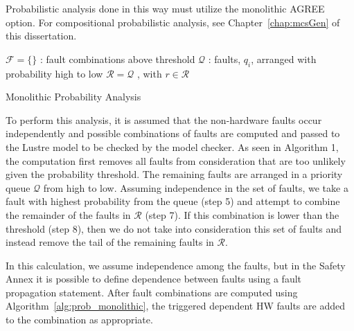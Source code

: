 Probabilistic analysis done in this way must utilize the monolithic AGREE option. For compositional probabilistic analysis, see Chapter~\ref{chap:mcsGen} of this dissertation.

\begin{algorithm}[H]
	$\mathcal{F} = \{\}$ : fault combinations above threshold \;
	$\mathcal{Q}$ : faults, $q_i$, arranged with probability high to low \;
	$\mathcal{R} = \mathcal{Q}$ , with $r \in \mathcal{R}$\;
	\caption{Monolithic Probability Analysis}
	\label{alg:prob_monolithic}
\end{algorithm}

To perform this analysis, it is assumed that the non-hardware faults occur independently and possible combinations of faults are computed and passed to the Lustre model to be checked by the model checker. As seen in Algorithm 1, the computation first removes all faults from consideration that are too unlikely given the probability threshold. The remaining faults are arranged in a priority queue $\mathcal{Q}$ from high to low. Assuming independence in the set of faults, we take a fault with highest probability from the queue (step 5) and attempt to combine the remainder of the faults in $\mathcal{R}$ (step 7). If this combination is lower than the threshold (step 8), then we do not take into consideration this set of faults and instead remove the tail of the remaining faults in $\mathcal{R}$. 
 
In this calculation, we assume independence among the faults, but in the Safety Annex it is possible to define dependence between faults using a fault propagation statement. After fault combinations are computed using Algorithm~\ref{alg:prob_monolithic}, the triggered dependent HW faults are added to the combination as appropriate. 

